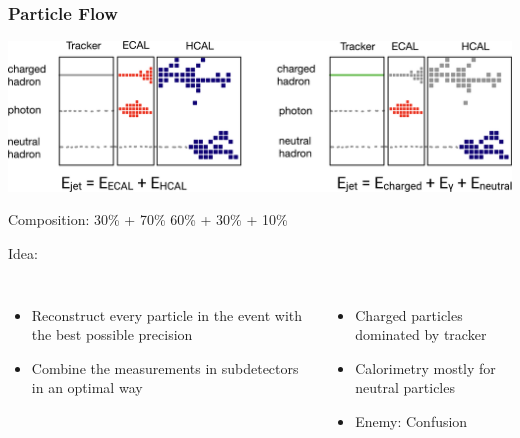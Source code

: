\documentclass[aspectratio=169]{beamer}
\newcommand{\bluetext}[1]{%
  \textcolor{myBlue}{#1}
}
\begin{document}
\begin{frame}
  \frametitle{Particle Flow}

  \includegraphics[width=\linewidth]{figures/particle_flow_diagram.pdf}
  \begin{adjustwidth}{-1em}{-1em}
    \vspace{-1.5ex}
    Composition: 30\% + 70\% \hspace{9.5em} 60\% + 30\% + 10\%
  \end{adjustwidth}

  \vspace{0.5em}
  \bluetext{Idea:}
  \begin{columns}[c]
    \begin{itemize}
      \item Reconstruct every particle in the event with the best possible
            precision
      \item Combine the measurements in subdetectors in an optimal way
    \end{itemize}

    \begin{itemize}
      \item Charged particles dominated by tracker
      \item Calorimetry mostly for neutral particles
      \item \bluetext{Enemy: Confusion}
    \end{itemize}
  \end{columns}

\end{frame}
\end{document}

